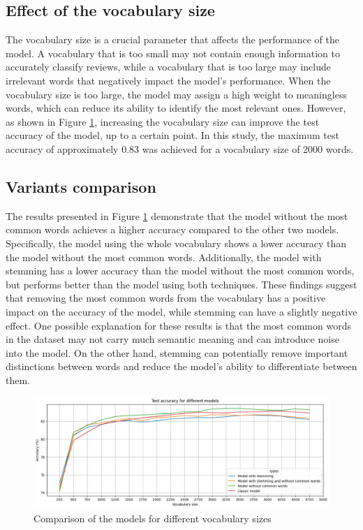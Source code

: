 \documentclass[eng]{class}
\begin{document}
\subsection{Effect of the vocabulary size}
The vocabulary size is a crucial parameter that affects the performance of the model.
A vocabulary that is too small may not contain enough information to accurately classify reviews,
while a vocabulary that is too large may include irrelevant words that negatively impact the model's performance.
When the vocabulary size is too large, the model may assign a high weight to meaningless words, which can reduce its ability to identify the most relevant ones.\newline
However, as shown in Figure \ref{fig-1}, increasing the vocabulary size can improve the test accuracy of the model, up to a certain point.
In this study, the maximum test accuracy of approximately 0.83 was achieved for a vocabulary size of 2000 words.

\subsection{Variants comparison}
The results presented in Figure \ref{fig-1} demonstrate that the model without the most common words achieves a higher accuracy compared to the other two models.
Specifically, the model using the whole vocabulary shows a lower accuracy than the model without the most common words.
Additionally, the model with stemming has a lower accuracy than the model without the most common words, but performs better than the model using both techniques. \newline
These findings suggest that removing the most common words from the vocabulary has a positive impact on the accuracy of the model,
while stemming can have a slightly negative effect.
One possible explanation for these results is that the most common words in the dataset may not carry much semantic meaning and can introduce noise into the model.
On the other hand, stemming can potentially remove important distinctions between words and reduce the model's ability to differentiate between them.
\begin{figure}[h]
  \centering
  \includegraphics[width=.8\columnwidth]{images/modelComp.png}
  \caption{Comparison of the models for different vocabulary sizes}
  \label{fig-1}
\end{figure}
\end{document}
